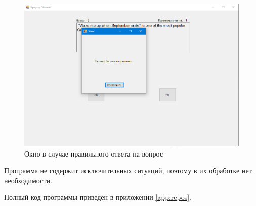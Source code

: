 \begin{figure}[H]
    \centering
    \includegraphics[scale=0.6]{task9/result.png}
	\caption{Окно в случае правильного ответа на вопрос}
	\label{fig:result9}
\end{figure}
Программа не содержит исключительных ситуаций, поэтому в их обработке нет необходимости.

Полный код программы приведен в приложении \ref{app:repos}.


